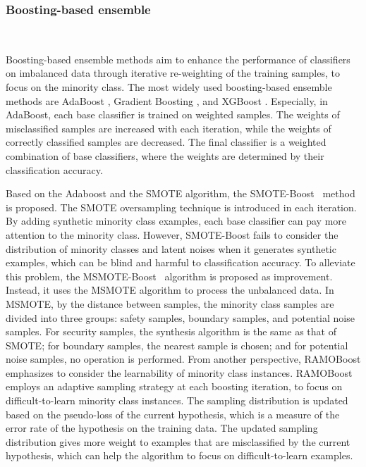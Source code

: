 \subsubsection{Boosting-based ensemble}\
\label{s342}

Boosting-based ensemble methods aim to enhance the performance of classifiers on imbalanced data through iterative re-weighting of the training samples, to focus on the minority class. The most widely used boosting-based ensemble methods are AdaBoost \cite{hastie2009multi}, Gradient Boosting \cite{friedman2001greedy}, and XGBoost \cite{chen2016xgboost}. Especially, in AdaBoost, each base classifier is trained on weighted samples. The weights of misclassified samples are increased with each iteration, while the weights of correctly classified samples are decreased. The final classifier is a weighted combination of base classifiers, where the weights are determined by their classification accuracy.

Based on the Adaboost and the SMOTE algorithm, the SMOTE-Boost~\cite{ref_3} method is proposed. The SMOTE oversampling technique is introduced in each iteration. By adding synthetic minority class examples, each base classifier can pay more attention to the minority class. 
However, SMOTE-Boost fails to consider the distribution of minority classes and latent noises when it generates synthetic examples, which can be blind and harmful to classification accuracy. To alleviate this problem, the MSMOTE-Boost~\cite{ref_8} algorithm is proposed as improvement. Instead, it uses the MSMOTE algorithm to process the unbalanced data. In MSMOTE, by the distance between samples, the minority class samples are divided into three groups: safety samples, boundary samples, and potential noise samples. For security samples, the synthesis algorithm is the same as that of SMOTE; for boundary samples, the nearest sample is chosen; and for potential noise samples, no operation is performed. From another perspective, RAMOBoost \cite{chen2010ramoboost} emphasizes to consider the learnability of minority class instances. RAMOBoost employs an adaptive sampling strategy at each boosting iteration, to focus on difficult-to-learn minority class instances. The sampling distribution is updated based on the pseudo-loss of the current hypothesis, which is a measure of the error rate of the hypothesis on the training data. The updated sampling distribution gives more weight to examples that are misclassified by the current hypothesis, which can help the algorithm to focus on difficult-to-learn examples.

